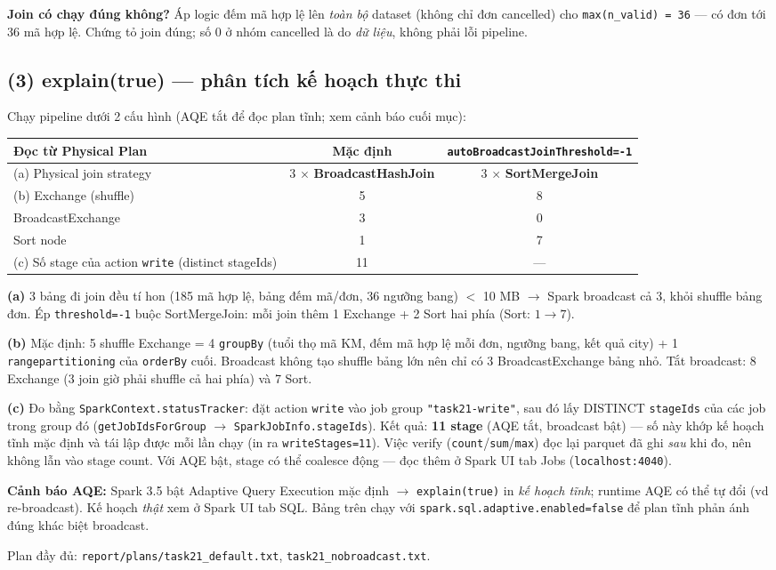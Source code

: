 \textbf{Join có chạy đúng không?} Áp logic đếm mã hợp lệ lên \emph{toàn bộ} dataset (không chỉ đơn cancelled) cho \texttt{max(n\_valid) = 36} — có đơn tới 36 mã hợp lệ. Chứng tỏ join đúng; số 0 ở nhóm cancelled là do \emph{dữ liệu}, không phải lỗi pipeline.

\subsection*{(3) explain(true) — phân tích kế hoạch thực thi}
Chạy pipeline dưới 2 cấu hình (AQE tắt để đọc plan tĩnh; xem cảnh báo cuối mục):

\begin{center}
\begin{tabular}{lcc}
\hline
Đọc từ Physical Plan & Mặc định & \texttt{autoBroadcastJoinThreshold=-1} \\
\hline
(a) Physical join strategy & 3 $\times$ \textbf{BroadcastHashJoin} & 3 $\times$ \textbf{SortMergeJoin} \\
(b) Exchange (shuffle) & 5 & 8 \\
\quad BroadcastExchange & 3 & 0 \\
\quad Sort node & 1 & 7 \\
(c) Số stage của action \texttt{write} (distinct stageIds) & 11 & --- \\
\hline
\end{tabular}
\end{center}

\textbf{(a)} 3 bảng đi join đều tí hon (185 mã hợp lệ, bảng đếm mã/đơn, 36 ngưỡng bang) $<$ 10 MB $\to$ Spark broadcast cả 3, khỏi shuffle bảng đơn. Ép \texttt{threshold=-1} buộc SortMergeJoin: mỗi join thêm 1 Exchange + 2 Sort hai phía (Sort: $1 \to 7$).

\textbf{(b)} Mặc định: 5 shuffle Exchange = 4 \texttt{groupBy} (tuổi thọ mã KM, đếm mã hợp lệ mỗi đơn, ngưỡng bang, kết quả city) + 1 \texttt{rangepartitioning} của \texttt{orderBy} cuối. Broadcast không tạo shuffle bảng lớn nên chỉ có 3 BroadcastExchange bảng nhỏ. Tắt broadcast: 8 Exchange (3 join giờ phải shuffle cả hai phía) và 7 Sort.

\textbf{(c)} Đo bằng \texttt{SparkContext.statusTracker}: đặt action \texttt{write} vào job group \texttt{"task21-write"}, sau đó lấy DISTINCT \texttt{stageIds} của các job trong group đó (\texttt{getJobIdsForGroup} $\to$ \texttt{SparkJobInfo.stageIds}). Kết quả: \textbf{11 stage} (AQE tắt, broadcast bật) — số này khớp kế hoạch tĩnh mặc định và tái lập được mỗi lần chạy (in ra \texttt{writeStages=11}). Việc verify (\texttt{count}/\texttt{sum}/\texttt{max}) đọc lại parquet đã ghi \emph{sau} khi đo, nên không lẫn vào stage count. Với AQE bật, stage có thể coalesce động — đọc thêm ở Spark UI tab Jobs (\texttt{localhost:4040}).

\textbf{Cảnh báo AQE:} Spark 3.5 bật Adaptive Query Execution mặc định $\to$ \texttt{explain(true)} in \emph{kế hoạch tĩnh}; runtime AQE có thể tự đổi (vd re-broadcast). Kế hoạch \emph{thật} xem ở Spark UI tab SQL. Bảng trên chạy với \texttt{spark.sql.adaptive.enabled=false} để plan tĩnh phản ánh đúng khác biệt broadcast.

Plan đầy đủ: \texttt{report/plans/task21\_default.txt}, \texttt{task21\_nobroadcast.txt}.
